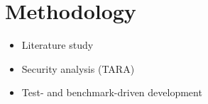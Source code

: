 \chapter{Methodology}

\begin{itemize}
    \item Literature study
    \item Security analysis (TARA)
    \item Test- and benchmark-driven development
\end{itemize}
